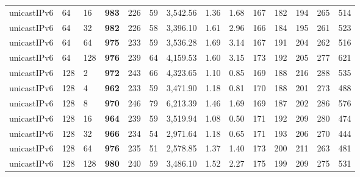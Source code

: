 \begin{table}[!htb]
\begin{tabular}{@{}llllllllllllll@{}}
		unicastIPv6 & 64           & 16    & \textbf{983}  & 226  & 59  & 3,542.56 & 1.36     & 1.68     & 167 & 182 & 194 & 265 & 514  \\
		unicastIPv6 & 64           & 32    & \textbf{982}  & 226  & 58  & 3,396.10 & 1.61     & 2.96     & 166 & 184 & 195 & 261 & 523  \\
		unicastIPv6 & 64           & 64    & \textbf{975}  & 233  & 59  & 3,536.28 & 1.69     & 3.14     & 167 & 191 & 204 & 262 & 516  \\
		unicastIPv6 & 64           & 128   & \textbf{976}  & 239  & 64  & 4,159.53 & 1.60     & 3.15     & 173 & 192 & 205 & 277 & 621  \\ \hline
		unicastIPv6 & 128          & 2     & \textbf{972}  & 243  & 66  & 4,323.65 & 1.10     & 0.85     & 169 & 188 & 216 & 288 & 535  \\
		unicastIPv6 & 128          & 4     & \textbf{962}  & 233  & 59  & 3,471.90 & 1.18     & 0.81     & 170 & 188 & 201 & 273 & 488  \\
		unicastIPv6 & 128          & 8     & \textbf{970}  & 246  & 79  & 6,213.39 & 1.46     & 1.69     & 169 & 187 & 202 & 286 & 576  \\
		unicastIPv6 & 128          & 16    & \textbf{964}  & 239  & 59  & 3,519.94 & 1.08     & 0.50     & 171 & 192 & 209 & 280 & 474  \\
		unicastIPv6 & 128          & 32    & \textbf{966}  & 234  & 54  & 2,971.64 & 1.18     & 0.65     & 171 & 193 & 206 & 270 & 444  \\
		unicastIPv6 & 128          & 64    & \textbf{976}  & 235  & 51  & 2,578.85 & 1.37     & 1.40     & 173 & 200 & 211 & 263 & 481  \\
		unicastIPv6 & 128          & 128   & \textbf{980}  & 240  & 59  & 3,486.10 & 1.52     & 2.27     & 175 & 199 & 209 & 275 & 531  \\ \bottomrule
	\end{tabular}
\end{table}
